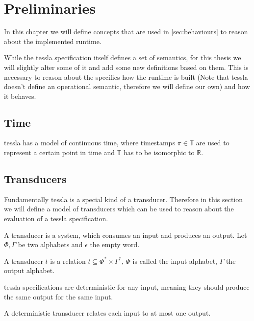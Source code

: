 \chapter{Preliminaries}
\label{sec:definitions}

In this chapter we will define concepts that are used in \cref{sec:behaviours} to reason about the implemented runtime.

While the \gls{tessla} specification itself defines a set of semantics, for this thesis we will slightly alter some of it and add some new definitions based on them.
This is necessary to reason about the specifics how the runtime is built (Note that \gls{tessla} doesn't define an operational semantic, therefore we will define our own) and how it behaves.

\section{Time}
\label{sec:definitions:time}

\gls{tessla} has a model of continuous time, where timestamps \(\pi \in \mathbb{T} \) are used to represent a certain point in time and \(\mathbb{T}\) has to be isomorphic to \(\mathbb{R}\).

\section{Transducers}
\label{sec:definitions:transducers}

Fundamentally \gls{tessla} is a special kind of a transducer.
Therefore in this section we will define a model of transducers which can be used to reason about the evaluation of a \gls{tessla} specification.

A transducer is a system, which consumes an input and produces an output.
Let \(\Phi, \Gamma\) be two alphabets and \(\epsilon\) the empty word.

\begin{definition}[name = Transducer]\label{def:transducer}
  A transducer \(t\) is a relation \(t \subseteq \Phi^* \times \Gamma^*\), \(\Phi\) is called the input alphabet, \(\Gamma\) the output alphabet.
\end{definition}

\gls{tessla} specifications are deterministic for any input, meaning they should produce the same output for the same input.

\begin{definition}[name = Deterministic Transducer]\label{def:deterministic_transducer}
  A deterministic transducer relates each input to at most one output.
\end{definition}

